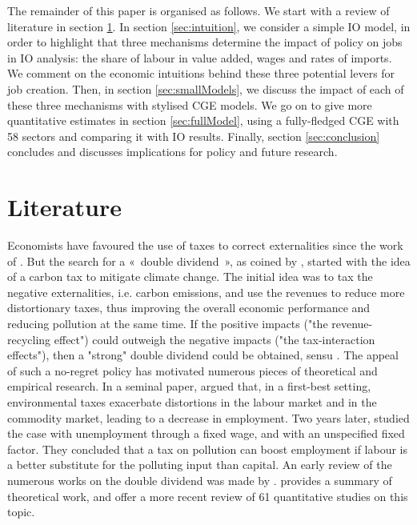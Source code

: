 The remainder of this paper is organised as follows.
We start with a review of literature in section \ref{sec:literature}. In section \ref{sec:intuition}, we consider a simple IO model, in order to highlight that three mechanisms determine the impact of policy on jobs in IO analysis: the share of labour in value added, wages and rates of imports. We comment on the economic intuitions behind these three potential levers for job creation.
Then, in section  \ref{sec:smallModels}, we discuss the impact of each of these three mechanisms with stylised CGE models.
We go on to give more quantitative estimates in section \ref{sec:fullModel}, using a fully-fledged CGE with 58 sectors and comparing it with IO results.
Finally, section \ref{sec:conclusion} concludes and discusses implications for policy and future research.



\section{Literature} \label{sec:literature}

Economists have favoured the use of taxes to correct externalities since the work of \citet{Pigou1920}.
But the search for a «~double dividend~», as coined by \citet{Pearce1991}, started with the idea of a carbon tax to mitigate climate change. The initial idea was to tax the negative externalities, i.e. carbon emissions, and use the revenues to reduce more distortionary taxes, thus improving the overall economic performance and reducing pollution at the same time. If the positive impacts ("the revenue-recycling effect") could outweigh the negative impacts ("the tax-interaction effects"), then a "strong" double dividend could be obtained, sensu \citet{Goulder1994}.
The appeal of such a no-regret policy has motivated numerous pieces of theoretical and empirical research. 
In a seminal paper, \citet{Bovenberg1994a} argued that, in a first-best setting, environmental taxes exacerbate distortions in the labour market and in the commodity market, leading to a decrease in employment.
Two years later, \citet{Bovenberg1996} studied the case with unemployment through a fixed wage, and with an unspecified fixed factor. They concluded that a tax on pollution can boost employment if labour is a better substitute for the polluting input than capital. 
An early review of the numerous works on the double dividend was made by \citet{Goulder1994}. \citet{Chiroleu-Assouline2001} provides a summary of theoretical work, and \citet{Patuelli2005} offer a more recent review of 61 quantitative studies on this topic.


